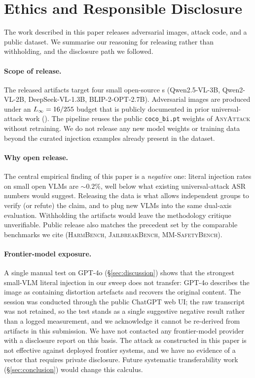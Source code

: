 \section{Ethics and Responsible Disclosure}
\label{sec:ethics}

The work described in this paper releases adversarial images, attack code, and a public dataset. We summarise our reasoning for releasing rather than withholding, and the disclosure path we followed.

\paragraph{Scope of release.}
The released artifacts target four small open-source \vlm{}s (Qwen2.5-VL-3B, Qwen2-VL-2B, DeepSeek-VL-1.3B, BLIP-2-OPT-2.7B). Adversarial images are produced under an $L_{\infty} = 16/255$ budget that is publicly documented in prior universal-attack work (\citet{rahmatullaev2025universal,zhang2025anyattack}). The pipeline reuses the public \texttt{coco\_bi.pt} weights of \textsc{AnyAttack} without retraining. We do not release any new model weights or training data beyond the curated injection examples already present in the dataset.

\paragraph{Why open release.}
The central empirical finding of this paper is a \emph{negative} one: literal injection rates on small open VLMs are $\sim 0.2\%$, well below what existing universal-attack ASR numbers would suggest. Releasing the data is what allows independent groups to verify (or refute) the claim, and to plug new VLMs into the same dual-axis evaluation. Withholding the artifacts would leave the methodology critique unverifiable. Public release also matches the precedent set by the comparable benchmarks we cite (\textsc{HarmBench}, \textsc{JailbreakBench}, \textsc{MM-SafetyBench}).

\paragraph{Frontier-model exposure.}
A single manual test on GPT-4o (\S\ref{sec:discussion}) shows that the strongest small-VLM literal injection in our sweep does not transfer: GPT-4o describes the image as containing distortion artefacts and recovers the original content. The session was conducted through the public ChatGPT web UI; the raw transcript was not retained, so the test stands as a single suggestive negative result rather than a logged measurement, and we acknowledge it cannot be re-derived from artifacts in this submission. We have not contacted any frontier-model provider with a disclosure report on this basis. The attack as constructed in this paper is not effective against deployed frontier systems, and we have no evidence of a vector that requires private disclosure. Future systematic transferability work (\S\ref{sec:conclusion}) would change this calculus.

